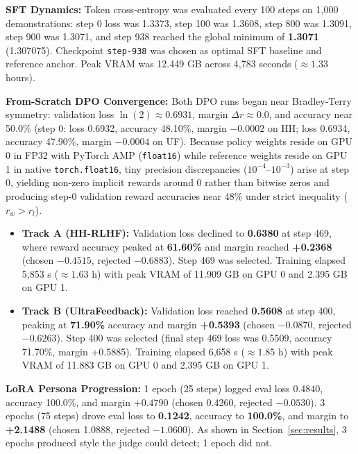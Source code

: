 \documentclass[11pt,a4paper]{article}
\begin{document}
\noindent\textbf{SFT Dynamics:} Token cross-entropy was evaluated every 100 steps on 1,000 demonstrations: step 0 loss was 1.3373, step 100 was 1.3608, step 800 was 1.3091, step 900 was 1.3071, and step 938 reached the global minimum of \textbf{1.3071} (1.307075). Checkpoint \texttt{step-938} was chosen as optimal SFT baseline and reference anchor. Peak VRAM was 12.449 GB across 4,783 seconds ($\approx 1.33$ hours).

\noindent\textbf{From-Scratch DPO Convergence:} Both DPO runs began near Bradley-Terry symmetry: validation loss $\ln(2) \approx 0.6931$, margin $\Delta r \approx 0.0$, and accuracy near 50.0\% (step 0: loss 0.6932, accuracy 48.10\%, margin $-0.0002$ on HH; loss 0.6934, accuracy 47.90\%, margin $-0.0004$ on UF). Because policy weights reside on GPU 0 in FP32 with PyTorch AMP (\texttt{float16}) while reference weights reside on GPU 1 in native \texttt{torch.float16}, tiny precision discrepancies ($10^{-4}\text{--}10^{-3}$) arise at step 0, yielding non-zero implicit rewards around 0 rather than bitwise zeros and producing step-0 validation reward accuracies near 48\% under strict inequality ($r_w > r_l$).
\begin{itemize}
    \item \textbf{Track A (HH-RLHF):} Validation loss declined to \textbf{0.6380} at step 469, where reward accuracy peaked at \textbf{61.60\%} and margin reached \textbf{+0.2368} (chosen $-0.4515$, rejected $-0.6883$). Step 469 was selected. Training elapsed 5,853 s ($\approx 1.63$ h) with peak VRAM of 11.909 GB on GPU 0 and 2.395 GB on GPU 1.
    \item \textbf{Track B (UltraFeedback):} Validation loss reached \textbf{0.5608} at step 400, peaking at \textbf{71.90\%} accuracy and margin \textbf{+0.5393} (chosen $-0.0870$, rejected $-0.6263$). Step 400 was selected (final step 469 loss was 0.5509, accuracy 71.70\%, margin +0.5885). Training elapsed 6,658 s ($\approx 1.85$ h) with peak VRAM of 11.883 GB on GPU 0 and 2.395 GB on GPU 1.
\end{itemize}

\noindent\textbf{LoRA Persona Progression:} 1 epoch (25 steps) logged eval loss 0.4840, accuracy 100.0\%, and margin $+0.4790$ (chosen 0.4260, rejected $-0.0530$). 3 epochs (75 steps) drove eval loss to \textbf{0.1242}, accuracy to \textbf{100.0\%}, and margin to \textbf{+2.1488} (chosen 1.0888, rejected $-1.0600$). As shown in Section~\ref{sec:results}, 3 epochs produced style the judge could detect; 1 epoch did not.
\end{document}
